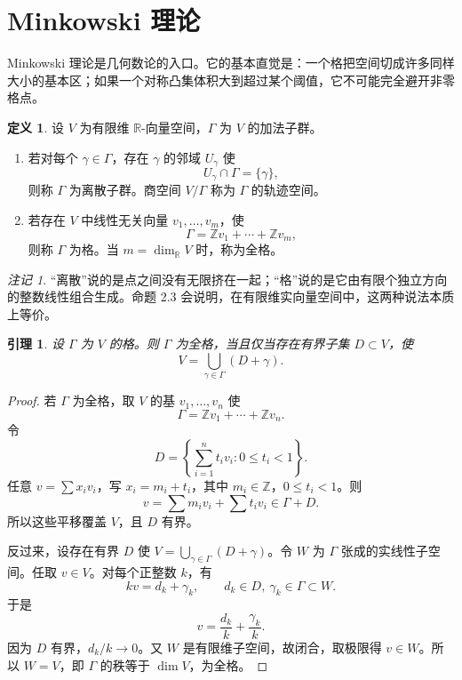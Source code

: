 \documentclass[11pt,a4paper,openany]{ctexbook}
\numberwithin{equation}{chapter}
\newcommand{\R}{\mathbb{R}}
\newcommand{\Z}{\mathbb{Z}}
\theoremstyle{plain}
\newtheorem{lemma}[theorem]{引理}
\theoremstyle{definition}
\newtheorem{definition}[theorem]{定义}
\theoremstyle{remark}
\newtheorem{remark}[theorem]{注记}
\begin{document}
\section{Minkowski 理论}

Minkowski 理论是几何数论的入口。它的基本直觉是：一个格把空间切成许多同样大小的基本区；如果一个对称凸集体积大到超过某个阈值，它不可能完全避开非零格点。

\begin{definition}
设 $V$ 为有限维 $\R$-向量空间，$\Gamma$ 为 $V$ 的加法子群。
\begin{enumerate}[label=(\arabic*)]
\item 若对每个 $\gamma\in\Gamma$，存在 $\gamma$ 的邻域 $U_\gamma$ 使
\[
U_\gamma\cap\Gamma=\{\gamma\},
\]
则称 $\Gamma$ 为离散子群。商空间 $V/\Gamma$ 称为 $\Gamma$ 的轨迹空间。
\item 若存在 $V$ 中线性无关向量 $v_1,\dots,v_m$，使
\[
\Gamma=\Z v_1+\cdots+\Z v_m,
\]
则称 $\Gamma$ 为格。当 $m=\dim_\R V$ 时，称为全格。
\end{enumerate}
\end{definition}

\begin{remark}
“离散”说的是点之间没有无限挤在一起；“格”说的是它由有限个独立方向的整数线性组合生成。命题 2.3 会说明，在有限维实向量空间中，这两种说法本质上等价。
\end{remark}

\begin{lemma}
设 $\Gamma$ 为 $V$ 的格。则 $\Gamma$ 为全格，当且仅当存在有界子集 $D\subset V$，使
\[
V=\bigcup_{\gamma\in\Gamma}(D+\gamma).
\]
\end{lemma}

\begin{proof}
若 $\Gamma$ 为全格，取 $V$ 的基 $v_1,\dots,v_n$ 使
\[
\Gamma=\Z v_1+\cdots+\Z v_n.
\]
令
\[
D=\left\{\sum_{i=1}^n t_iv_i:0\le t_i<1\right\}.
\]
任意 $v=\sum x_iv_i$，写 $x_i=m_i+t_i$，其中 $m_i\in\Z$，$0\le t_i<1$。则
\[
v=\sum m_iv_i+\sum t_iv_i\in \Gamma+D.
\]
所以这些平移覆盖 $V$，且 $D$ 有界。

反过来，设存在有界 $D$ 使 $V=\bigcup_{\gamma\in\Gamma}(D+\gamma)$。令 $W$ 为 $\Gamma$ 张成的实线性子空间。任取 $v\in V$。对每个正整数 $k$，有
\[
kv=d_k+\gamma_k,\qquad d_k\in D,\ \gamma_k\in\Gamma\subset W.
\]
于是
\[
v=\frac{d_k}{k}+\frac{\gamma_k}{k}.
\]
因为 $D$ 有界，$d_k/k\to0$。又 $W$ 是有限维子空间，故闭合，取极限得 $v\in W$。所以 $W=V$，即 $\Gamma$ 的秩等于 $\dim V$，为全格。
\end{proof}
\end{document}

